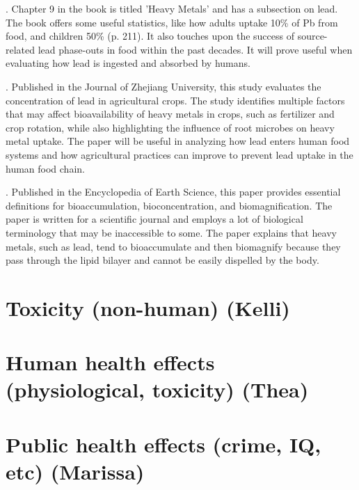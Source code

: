 \documentclass{article}\usepackage[]{graphicx}\usepackage[]{color}
\begin{document}
.
Chapter 9 in the book is titled 'Heavy Metals' and has a subsection on lead. The book offers some useful statistics, like how adults uptake 10\% of Pb from food, and children 50\% (p. 211). It also touches upon the success of source-related lead phase-outs in food within the past decades. It will prove useful when evaluating how lead is ingested and absorbed by humans. 

.
Published in the Journal of Zhejiang University, this study evaluates the concentration of lead in agricultural crops. The study identifies multiple factors that may affect bioavailability of heavy metals in crops, such as fertilizer and crop rotation, while also highlighting the influence of root microbes on heavy metal uptake. The paper will be useful in analyzing how lead enters human food systems and how agricultural practices can improve to prevent lead uptake in the human food chain. 

.
Published in the Encyclopedia of Earth Science, this paper provides essential definitions for bioaccumulation, bioconcentration, and biomagnification. The paper is written for a scientific journal and employs a lot of biological terminology that may be inaccessible to some. The paper explains that heavy metals, such as lead, tend to bioaccumulate and then biomagnify because they pass through the lipid bilayer and cannot be easily dispelled by the body. 


\section{Toxicity (non-human) (Kelli)}

\section{Human health effects (physiological, toxicity) (Thea)}

\section{Public health effects (crime, IQ, etc) (Marissa)}
\end{document}
